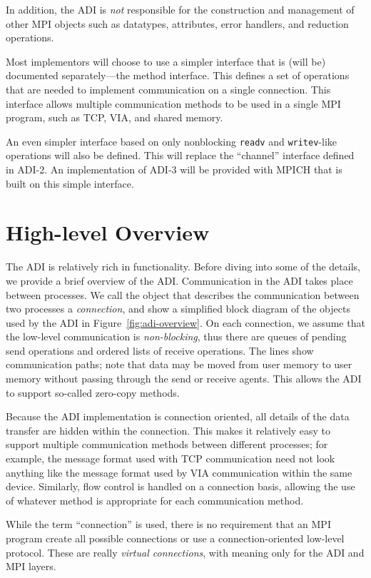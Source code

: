 \documentclass{article}
\def\code#1{\texttt{#1}}
\begin{document}
In addition, the ADI is \emph{not} responsible for the construction
and management of other MPI objects such as datatypes, attributes,
error handlers, and reduction operations.  

Most implementors will choose to use a simpler interface that is
(will be) documented separately---the method interface.  This defines
a set of operations that are needed to implement communication on a
single connection.  This interface allows multiple communication
methods to be used in a single MPI program, such as TCP, VIA, and
shared memory.  

An even simpler interface based on only nonblocking \code{readv} and
\code{writev}-like operations will also be defined.  This will replace
the ``channel'' interface defined in ADI-2.  An implementation of
ADI-3 will be provided with MPICH that is built on this simple interface.

\section{High-level Overview}
\label{sec:high-level}

The ADI is relatively rich in functionality.  Before diving into some of the
details, we provide a brief overview of the ADI.
Communication in the ADI takes place between processes.  We call the object
that describes the communication between two processes a \emph{connection},
and show a simplified block diagram of the objects used by the ADI in
Figure~\ref{fig:adi-overview}.
On each connection, we assume that the low-level communication is
\emph{non-blocking}, thus there are queues of pending send operations and
ordered lists of receive operations.  The lines show communication paths; note
that data may be moved from user memory to user memory without passing through
the send or receive agents.  This allows the ADI to support so-called
zero-copy methods.

Because the ADI implementation is connection oriented, all details of the data
transfer are hidden within the connection.  This makes it relatively easy to
support multiple communication methods between different processes; for
example, the message format used with TCP communication need not look anything
like the message format used by VIA communication within the same device.
Similarly, flow control is handled on a connection basis, allowing the use of
whatever method is appropriate for each communication method.

While the term ``connection'' is used, there is no requirement that an MPI
program create all possible connections or use a connection-oriented low-level
protocol.  These are really \emph{virtual connections}, with meaning only for
the ADI and MPI layers.
\end{document}
